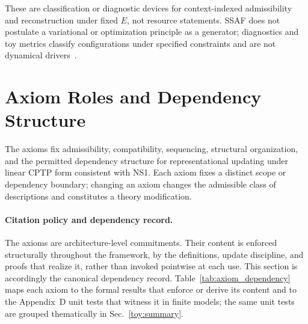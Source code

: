 \documentclass[aps,prx,onecolumn,11pt]{revtex4-2}
\theoremstyle{plain}
\theoremstyle{definition}
\theoremstyle{remark}
\begin{document}
These are classification or diagnostic devices for context-indexed
admissibility and reconstruction under fixed \(E\), not resource
statements. SSAF does not postulate a variational or optimization
principle as a generator; diagnostics and toy metrics classify
configurations under specified constraints and are not dynamical
drivers~\cite{Goldstein2002,Jaynes1957}.

\section{Axiom Roles and Dependency Structure}
\label{sec:axiomatic_minimality}

The axioms fix admissibility, compatibility, sequencing, structural
organization, and the permitted dependency structure for
representational updating under linear CPTP form consistent with NS1.
Each axiom fixes a distinct scope or dependency boundary; changing an
axiom changes the admissible class of descriptions and constitutes a
theory modification.

\paragraph*{Citation policy and dependency record.}
The axioms are architecture-level commitments. Their content is
enforced structurally throughout the framework, by the definitions,
update discipline, and proofs that realize it, rather than invoked
pointwise at each use. This section is accordingly the canonical
dependency record. Table~\ref{tab:axiom_dependency} maps each axiom to
the formal results that enforce or derive its content and to the
Appendix~D unit tests that witness it in finite models; the same unit
tests are grouped thematically in Sec.~\ref{toy:summary}.
\end{document}
